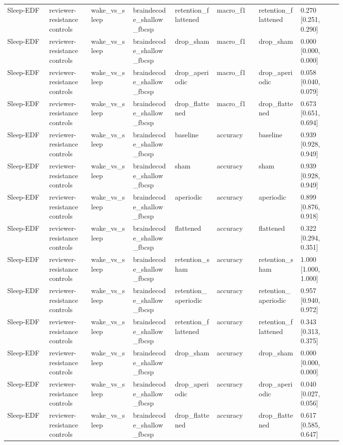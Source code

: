 \begin{longtable}{p{0.10\linewidth}p{0.10\linewidth}p{0.10\linewidth}p{0.10\linewidth}p{0.10\linewidth}p{0.10\linewidth}p{0.10\linewidth}p{0.10\linewidth}}
Sleep-EDF & reviewer-resistance controls & wake\_vs\_sleep & braindecode\_shallow\_fbcsp & retention\_flattened & macro\_f1 & retention\_flattened & 0.270 [0.251, 0.290]\\
Sleep-EDF & reviewer-resistance controls & wake\_vs\_sleep & braindecode\_shallow\_fbcsp & drop\_sham & macro\_f1 & drop\_sham & 0.000 [0.000, 0.000]\\
Sleep-EDF & reviewer-resistance controls & wake\_vs\_sleep & braindecode\_shallow\_fbcsp & drop\_aperiodic & macro\_f1 & drop\_aperiodic & 0.058 [0.040, 0.079]\\
Sleep-EDF & reviewer-resistance controls & wake\_vs\_sleep & braindecode\_shallow\_fbcsp & drop\_flattened & macro\_f1 & drop\_flattened & 0.673 [0.651, 0.694]\\
Sleep-EDF & reviewer-resistance controls & wake\_vs\_sleep & braindecode\_shallow\_fbcsp & baseline & accuracy & baseline & 0.939 [0.928, 0.949]\\
Sleep-EDF & reviewer-resistance controls & wake\_vs\_sleep & braindecode\_shallow\_fbcsp & sham & accuracy & sham & 0.939 [0.928, 0.949]\\
Sleep-EDF & reviewer-resistance controls & wake\_vs\_sleep & braindecode\_shallow\_fbcsp & aperiodic & accuracy & aperiodic & 0.899 [0.876, 0.918]\\
Sleep-EDF & reviewer-resistance controls & wake\_vs\_sleep & braindecode\_shallow\_fbcsp & flattened & accuracy & flattened & 0.322 [0.294, 0.351]\\
Sleep-EDF & reviewer-resistance controls & wake\_vs\_sleep & braindecode\_shallow\_fbcsp & retention\_sham & accuracy & retention\_sham & 1.000 [1.000, 1.000]\\
Sleep-EDF & reviewer-resistance controls & wake\_vs\_sleep & braindecode\_shallow\_fbcsp & retention\_aperiodic & accuracy & retention\_aperiodic & 0.957 [0.940, 0.972]\\
Sleep-EDF & reviewer-resistance controls & wake\_vs\_sleep & braindecode\_shallow\_fbcsp & retention\_flattened & accuracy & retention\_flattened & 0.343 [0.313, 0.375]\\
Sleep-EDF & reviewer-resistance controls & wake\_vs\_sleep & braindecode\_shallow\_fbcsp & drop\_sham & accuracy & drop\_sham & 0.000 [0.000, 0.000]\\
Sleep-EDF & reviewer-resistance controls & wake\_vs\_sleep & braindecode\_shallow\_fbcsp & drop\_aperiodic & accuracy & drop\_aperiodic & 0.040 [0.027, 0.056]\\
Sleep-EDF & reviewer-resistance controls & wake\_vs\_sleep & braindecode\_shallow\_fbcsp & drop\_flattened & accuracy & drop\_flattened & 0.617 [0.585, 0.647]\\

\end{longtable}
